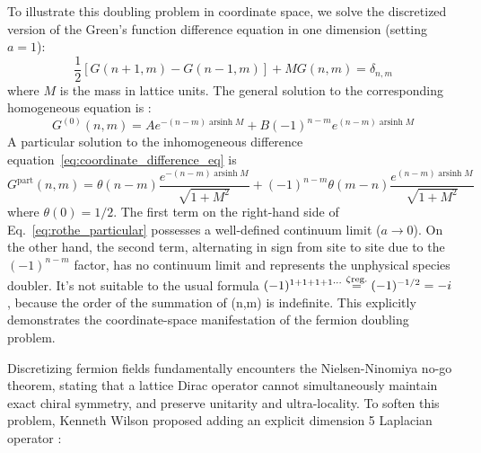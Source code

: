 To illustrate this doubling problem in coordinate space, we solve the discretized version of the Green's function difference equation in one dimension (setting $a=1$):
\begin{equation}
\frac{1}{2} \left[ G(n+1, m) - G(n-1, m) \right] + M G(n, m) = \delta_{n, m}
\label{eq:coordinate_difference_eq}
\end{equation}
where $M$ is the mass in lattice units. The general solution to the corresponding homogeneous equation is :
\begin{equation}
G^{(0)}(n, m) = A e^{-(n-m)\operatorname{arsinh} M} + B (-1)^{n-m} e^{(n-m)\operatorname{arsinh} M}
\label{eq:rothe_homogeneous}
\end{equation}
A particular solution to the inhomogeneous difference equation~\eqref{eq:coordinate_difference_eq} is
\begin{equation}
G^{\mathrm{part}}(n, m) = \theta(n-m) \frac{e^{-(n-m)\operatorname{arsinh} M}}{\sqrt{1+M^2}} + (-1)^{n-m}\theta(m-n) \frac{e^{(n-m)\operatorname{arsinh} M}}{\sqrt{1+M^2}}
\label{eq:rothe_particular}
\end{equation}
where $\theta(0) = 1/2$. The first term on the right-hand side of Eq.~\eqref{eq:rothe_particular} possesses a well-defined continuum limit ($a \to 0$). On the other hand, the second term, alternating in sign from site to site due to the $(-1)^{n-m}$ factor, has no continuum limit and represents the unphysical species doubler. It's not suitable to the usual formula $ (-1)^{1+1+1+1\cdots} \overset{\zeta \rm reg.}{=} (-1)^{-1/2} = -i $ , because the order of the summation of (n,m) is indefinite. This explicitly demonstrates the coordinate-space manifestation of the fermion doubling problem.

Discretizing fermion fields fundamentally encounters the Nielsen-Ninomiya no-go theorem, stating that a lattice Dirac operator cannot simultaneously maintain exact chiral symmetry, and preserve unitarity and  ultra-locality. To soften this problem, Kenneth Wilson proposed adding an explicit dimension 5 Laplacian operator :

